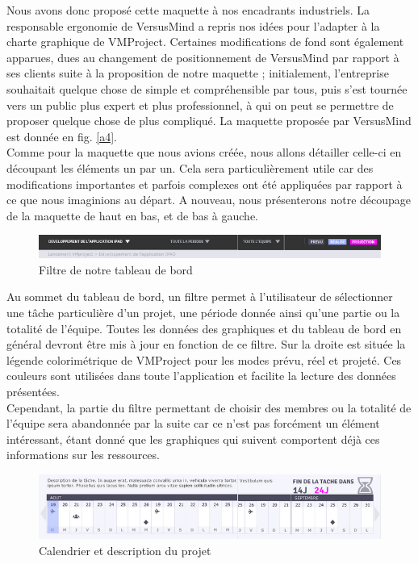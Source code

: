 \documentclass[12pt]{report}
\begin{document}
Nous avons donc proposé cette maquette à nos encadrants industriels. La responsable ergonomie de VersusMind a repris nos idées pour l’adapter à la charte graphique de VMProject. Certaines modifications de fond sont également apparues, dues au changement de positionnement de VersusMind par rapport à ses clients suite à la proposition de notre maquette ; initialement, l’entreprise souhaitait quelque chose de simple et compréhensible par tous, puis s’est tournée vers un public plus expert et plus professionnel, à qui on peut se permettre de proposer quelque chose de plus compliqué. La maquette proposée par VersusMind est donnée en fig. \ref{a4}.\\

Comme pour la maquette que nous avions créée, nous allons détailler celle-ci en découpant les éléments un par un. Cela sera particulièrement utile car des modifications importantes et parfois complexes ont été appliquées par rapport à ce que nous imaginions au départ. A nouveau, nous présenterons notre découpage de la maquette de haut en bas, et de bas à gauche.\\

\begin{figure}[H]
	\centering
	\includegraphics[width=1\textwidth]{pictures/maquetteVersusmind/filtre.jpg}
	\caption{Filtre de notre tableau de bord}
	\label{12}
\end{figure}

Au sommet du tableau de bord, un filtre permet à l'utilisateur de sélectionner une tâche particulière d'un projet, une période donnée ainsi qu'une partie ou la totalité de l'équipe. Toutes les données des graphiques et du tableau de bord en général devront être mis à jour en fonction de ce filtre. 
Sur la droite est située la légende colorimétrique de VMProject pour les modes prévu, réel et projeté. Ces couleurs sont utilisées dans toute l'application et facilite la lecture des données présentées.\\

Cependant, la partie du filtre permettant de choisir des membres ou la totalité de l'équipe sera abandonnée par la suite car ce n'est pas forcément un élément intéressant, étant donné que les graphiques qui suivent comportent déjà ces informations sur les ressources. \\

\begin{figure}[H]
	\centering
	\includegraphics[width=1\textwidth]{pictures/maquetteVersusmind/descriptioncalendrier.jpg}
	\caption{Calendrier et description du projet}
	\label{13}
\end{figure}
\end{document}
